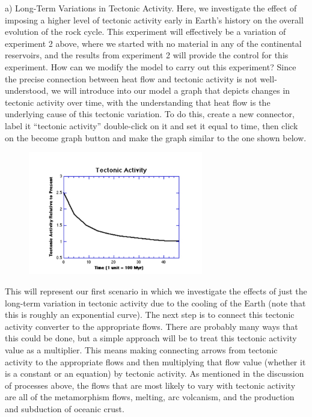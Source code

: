\documentclass[11pt,letterpaper]{article}
\begin{document}
a) Long-Term Variations in Tectonic Activity.
Here, we investigate the effect of imposing a higher level of tectonic activity early in Earth's history on the overall evolution of the rock cycle. This experiment will effectively be a variation of experiment 2 above, where we started with no material in any of the continental reservoirs, and the results from experiment 2 will provide the control for this experiment. How can we modify the model to carry out this experiment? Since the precise connection between heat flow and tectonic activity is not well-understood, we will introduce into our model a graph that depicts changes in tectonic activity over time, with the understanding that heat flow is the underlying cause of this tectonic variation. To do this, create a new connector, label it ``tectonic activity'' double-click on it and set it equal to time, then click on the become graph button and make the graph similar to the one shown below.

\begin{figure}
\includegraphics[width=3in]{./tectonic_activity}
\end{figure}

This will represent our first scenario in which we investigate the effects of just the long-term variation in tectonic activity due to the cooling of the Earth (note that this is roughly an exponential curve). The next step is to connect this tectonic activity converter to the appropriate flows. There are probably many ways that this could be done, but a simple approach will be to treat this tectonic activity value as a multiplier. This means making connecting arrows from tectonic activity to the appropriate flows and then multiplying that flow value (whether it is a constant or an equation) by tectonic activity. As mentioned in the discussion of processes above, the flows that are most likely to vary with tectonic activity are all of the metamorphism flows, melting, arc volcanism, and the production and subduction of oceanic crust.
\end{document}
